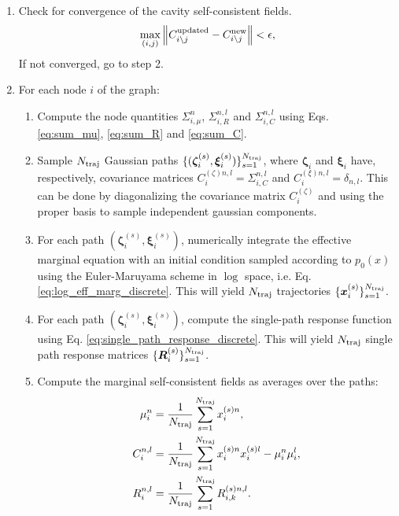 \documentclass[
    preprint,
    linenumbers,
    amsmath,amssymb,amsfonts,
    aps, physrev,
    superscriptaddress,
    10pt,
    bibnotes
    ]{revtex4-2}
\begin{document}
\begin{enumerate}
\begin{enumerate}
\begin{enumerate}
\begin{align*}
        R_{i\setminus j}^{({\rm new})n,l} & = \frac{1}{N_{\rm traj}}\sum_{s=1}^{N_{\rm traj}}R^{(s)n,l}_{i\setminus j,k}.
      \end{align*}
    \end{enumerate}
  \end{enumerate}
  \item Check for convergence of the cavity self-consistent fields. 
  \begin{equation}
    \max_{(i,j)}\left\lVert C^{\rm updated}_{i\setminus j} - C_{i\setminus j}^{\rm new} \right\rVert < \epsilon,
  \end{equation}
  If not converged, go to step 2.
  \item For each node $i$ of the graph:
  \begin{enumerate}
    \item Compute the node quantities $\Sigma_{i,\mu}^n$, $\Sigma_{i,R}^{n,l}$ and $\Sigma_{i,C}^{n,l}$ using Eqs. \eqref{eq:sum_mu}, \eqref{eq:sum_R} and \eqref{eq:sum_C}.
    \item Sample $N_{\rm traj}$ Gaussian paths $\{(\bm{\zeta}^{(s)}_{i},\bm{\xi}^{(s)}_{i})\}_{s=1}^{N_{\rm traj}}$, where $\bm{\zeta}_{i}$ and $\bm{\xi}_{i}$ have, respectively, covariance matrices $C^{(\zeta)n,l}_{i}=\Sigma_{i,C}^{n,l}$ and $C^{(\xi)n,l}_{i}=\delta_{n,l}$. This can be done by diagonalizing the covariance matrix $C^{(\zeta)}_{i}$ and using the proper basis to sample independent gaussian components.
    \item For each path $(\bm{\zeta}^{(s)}_{i},\bm{\xi}^{(s)}_{i})$, numerically integrate the effective marginal equation with an initial condition sampled according to $p_0(x)$ using the Euler-Maruyama scheme in $\log$ space, i.e. Eq. \eqref{eq:log_eff_marg_discrete}. This will yield $N_{\rm traj}$ trajectories $\{\bm{x}_{i}^{(s)}\}_{s=1}^{N_{\rm traj}}$.
    \item For each path $(\bm{\zeta}^{(s)}_{i},\bm{\xi}^{(s)}_{i})$, compute the single-path response function using Eq. \eqref{eq:single_path_response_discrete}. This will yield $N_{\rm traj}$ single path response matrices $\{\bm{R}^{(s)}_{i}\}_{s=1}^{N_{\rm traj}}$.
    \item Compute the marginal self-consistent fields as averages over the paths:
    \begin{align*}
      \mu_{i}^{n} & = \frac{1}{N_{\rm traj}}\sum_{s=1}^{N_{\rm traj}}x_{i}^{(s)n},\\
      C_{i}^{n,l} & = \frac{1}{N_{\rm traj}}\sum_{s=1}^{N_{\rm traj}}x_{i}^{(s)n} x_{i}^{(s)l} - \mu_{i}^n \mu_{i}^l,\\
      R_{i}^{n,l} & = \frac{1}{N_{\rm traj}}\sum_{s=1}^{N_{\rm traj}}R^{(s)n,l}_{i,k}.
    \end{align*}
  \end{enumerate}
\end{enumerate}
\end{document}
